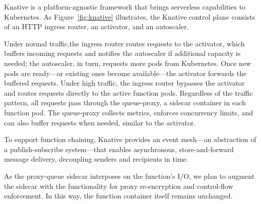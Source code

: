 %
%
Knative is a platform-agnostic framework that brings serverless capabilities to
Kubernetes.
%
As Figure~\ref{fig:knative} illustrates, the Knative control plane
consists of an HTTP ingress router, an activator, and an autoscaler.


Under normal traffic,the ingress router routes requests to the activator, which
buffers incoming requests and notifies the autoscaler if additional capacity is
needed; the autoscaler, in turn, requests more pods from Kubernetes.
%
Once new pods are ready---or existing ones become available---the activator
forwards the buffered requests.
%
Under high traffic, the ingress router bypasses the activator and routes
requests directly to the active function pods.
%
Regardless of the traffic pattern, all requests pass through the queue-proxy, a
sidecar container in each function pod.
%
The queue-proxy collects metrics, enforces concurrency limits, and can also
buffer requests when needed, similar to the activator.


To support function chaining, Knative provides an event mesh---an abstraction
of a publish-subscribe system---that enables asynchronous, store-and-forward
message delivery, decoupling senders and recipients in time.


%
As the proxy-queue sidecar interposes on the function's I/O, we plan to augment
the sidecar with the functionality for proxy re-encryption and control-flow
enforcement.
%
In this way, the function container itself remains unchanged.




